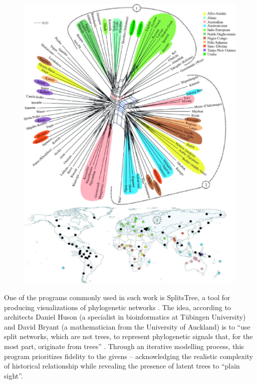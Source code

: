 \documentclass[output=paper]{langscibook}
\begin{document}
\begin{figure}
    \centering
    \includegraphics[scale=0.8]{figures/greenhiletal2010.png}
    \caption{\citet[2445]{Greenhilletal2010}}
    \label{fig:kaplan:greenhill2010}
\end{figure}

One of the programs commonly used in such work is SplitsTree, a tool for producing visualizations of phylogenetic networks \citep{Greenhilletal2010}. The idea, according to architects Daniel Huson (a specialist in bioinformatics at Tübingen University) and David Bryant (a mathematician from the University of Auckland) is to ``use split networks, which are not trees, to represent phylogenetic signals that, for the most part, originate from trees'' \citep[254-267]{HusonBryant2006}. Through an iterative modelling process, this program prioritizes fidelity to the givens – acknowledging the realistic complexity of historical relationship while revealing the presence of latent trees to ``plain sight''.
\end{document}
